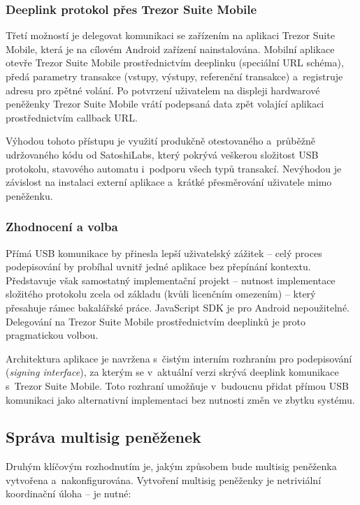 \subsubsection{Deeplink protokol přes Trezor Suite Mobile}

Třetí možností je delegovat komunikaci se zařízením na aplikaci Trezor
Suite Mobile, která je na cílovém Android zařízení nainstalována. Mobilní
aplikace otevře Trezor Suite Mobile prostřednictvím deeplinku (speciální
URL schéma), předá parametry transakce (vstupy, výstupy, referenční
transakce) a~registruje adresu pro zpětné volání. Po potvrzení uživatelem
na displeji hardwarové peněženky Trezor Suite Mobile vrátí podepsaná data
zpět volající aplikaci prostřednictvím callback URL.

Výhodou tohoto přístupu je využití produkčně otestovaného a~průběžně
udržovaného kódu od SatoshiLabs, který pokrývá veškerou složitost USB
protokolu, stavového automatu i~podporu všech typů transakcí. Nevýhodou
je závislost na instalaci externí aplikace a~krátké přesměrování
uživatele mimo peněženku.

\subsubsection{Zhodnocení a volba}

Přímá USB komunikace by přinesla lepší uživatelský zážitek -- celý
proces podepisování by probíhal uvnitř jedné aplikace bez přepínání
kontextu. Představuje však samostatný implementační projekt -- nutnost
implementace složitého protokolu zcela od základu (kvůli licenčním
omezením) -- který přesahuje rámec bakalářské práce. JavaScript SDK
je pro Android nepoužitelné. Delegování na Trezor Suite Mobile
prostřednictvím deeplinků je proto pragmatickou volbou.

Architektura aplikace je navržena s~čistým interním rozhraním pro
podepisování (\emph{signing interface}), za kterým se v~aktuální verzi
skrývá deeplink komunikace s~Trezor Suite Mobile. Toto rozhraní
umožňuje v~budoucnu přidat přímou USB komunikaci jako alternativní
implementaci bez nutnosti změn ve zbytku systému.


\subsection{Správa multisig peněženek}
\label{sec:analyza-multisig}

Druhým klíčovým rozhodnutím je, jakým způsobem bude multisig peněženka
vytvořena a~nakonfigurována. Vytvoření multisig peněženky je netriviální
koordinační úloha -- je nutné:

